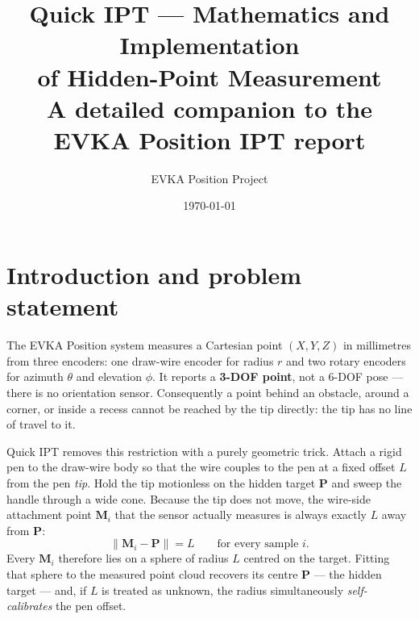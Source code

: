 \documentclass[11pt,a4paper]{article}
\title{Quick IPT --- Mathematics and Implementation\\of Hidden-Point Measurement\\[4pt]
\large A detailed companion to the EVKA Position IPT report}
\author{EVKA Position Project}
\date{\today}
\newcommand{\M}{\mathbf{M}}
\newcommand{\bP}{\mathbf{P}}
\newcommand{\norm}[1]{\left\lVert #1 \right\rVert}
\begin{document}
\maketitle

\section{Introduction and problem statement}

The EVKA Position system measures a Cartesian point $(X,Y,Z)$ in millimetres from
three encoders: one draw-wire encoder for radius $r$ and two rotary encoders for
azimuth $\theta$ and elevation $\phi$. It reports a \textbf{3-DOF point}, not a
6-DOF pose --- there is no orientation sensor. Consequently a point behind an
obstacle, around a corner, or inside a recess cannot be reached by the tip
directly: the tip has no line of travel to it.

Quick IPT removes this restriction with a purely geometric trick. Attach a rigid
pen to the draw-wire body so that the wire couples to the pen at a fixed offset $L$
from the pen \emph{tip}. Hold the tip motionless on the hidden target $\bP$ and
sweep the handle through a wide cone. Because the tip does not move, the wire-side
attachment point $\M_i$ that the sensor actually measures is always exactly $L$
away from $\bP$:
\begin{equation}
  \norm{\M_i - \bP} = L \qquad \text{for every sample } i .
  \label{eq:core}
\end{equation}
Every $\M_i$ therefore lies on a sphere of radius $L$ centred on the target.
Fitting that sphere to the measured point cloud recovers its centre $\bP$ --- the
hidden target --- and, if $L$ is treated as unknown, the radius simultaneously
\emph{self-calibrates} the pen offset.

\begin{center}
\end{center}
\end{document}
